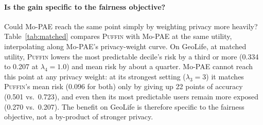 \documentclass[sigconf,anonymous,review]{acmart}
\newcommand{\puffin}{\textsc{Puffin}}
\begin{document}
\paragraph{Is the gain specific to the fairness objective?} Could Mo-PAE reach the same point simply by weighting privacy more heavily? Table~\ref{tab:matched} compares \puffin{} with Mo-PAE at the same utility, interpolating along Mo-PAE's privacy-weight curve. On GeoLife, at matched utility, \puffin{} lowers the most predictable decile's risk by a third or more (0.334 to 0.207 at $\lambda_4=1.0$) and mean risk by about a quarter. Mo-PAE cannot reach this point at any privacy weight: at its strongest setting ($\lambda_3=3$) it matches \puffin's mean risk (0.096 for both) only by giving up 22 points of accuracy (0.501 vs.\ 0.723), and even then its most predictable users remain more exposed (0.270 vs.\ 0.207). The benefit on GeoLife is therefore specific to the fairness objective, not a by-product of stronger privacy.
\end{document}
